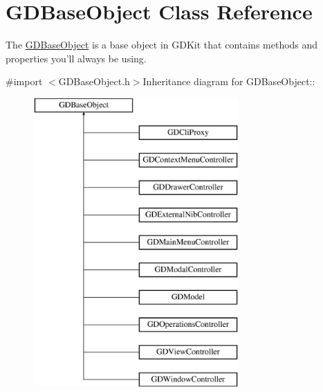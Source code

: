 \hypertarget{interface_g_d_base_object}{
\section{GDBaseObject Class Reference}
\label{interface_g_d_base_object}
}


The \hyperlink{interface_g_d_base_object}{GDBaseObject} is a base object in GDKit that contains methods and properties you'll always be using.  


{\ttfamily \#import $<$GDBaseObject.h$>$}Inheritance diagram for GDBaseObject::\begin{figure}[H]
\begin{center}
\leavevmode
\includegraphics[height=11cm]{interface_g_d_base_object}
\end{center}
\end{figure}
